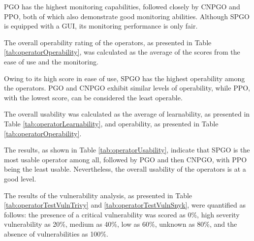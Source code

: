 PGO has the highest monitoring capabilities, followed closely by CNPGO and PPO, both of which also demonstrate good monitoring abilities. Although SPGO is equipped with a GUI, its monitoring performance is only fair.



The overall operability rating of the operators, as presented in Table \ref{tab:operatorOperability}, was calculated as the average of the scores from the ease of use and the monitoring.

Owing to its high score in ease of use, SPGO has the highest operability among the operators. PGO and CNPGO exhibit similar levels of operability, while PPO, with the lowest score, can be considered the least operable.


The overall usability was calculated as the average of learnability, as presented in Table \ref{tab:operatorLearnability}, and operability, as presented in Table \ref{tab:operatorOperability}.

The results, as shown in Table \ref{tab:operatorUsability}, indicate that SPGO is the most usable operator among all, followed by PGO and then CNPGO, with PPO being the least usable.
Nevertheless, the overall usability of the operators is at a good level.



The results of the vulnerability analysis, as presented in Table \ref{tab:operatorTestVulnTrivy} and \ref{tab:operatorTestVulnSnyk}, were quantified as follows: the presence of a critical vulnerability was scored as 0\%, high severity vulnerability as 20\%, medium as 40\%, low as 60\%, unknown as 80\%, and the absence of vulnerabilities as 100\%.

